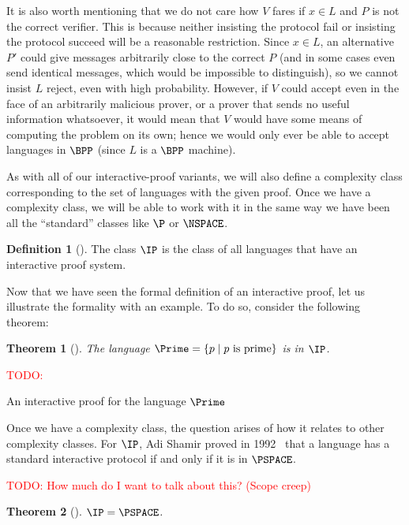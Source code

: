 \documentclass[english,12pt]{reedthesis}
\theoremstyle{plain}
\newtheorem{thm}{Theorem}[section]
\theoremstyle{definition}
\newtheorem{defn}[defn]{Definition}
\theoremstyle{remark}
\newcommand{\TODO}[1]{\textcolor{red}{TODO: #1}}
\begin{document}
It is also worth mentioning that we do not care how $V$ fares if $x \in L$ and $P$
is not the correct verifier. This is because neither insisting the protocol fail
or insisting the protocol succeed will be a reasonable restriction. Since
$x \in L$, an alternative $P'$ could give messages arbitrarily close to the
correct $P$ (and in some cases even send identical messages, which would be
impossible to distinguish), so we cannot insist $L$ reject, even with high
probability. However, if $V$ could accept even in the face of an arbitrarily
malicious prover, or a prover that sends no useful information whatsoever, it
would mean that $V$ would have some means of computing the problem on its own;
hence we would only ever be able to accept languages in $\BPP$ (since $L$ is a
$\BPP$ machine).

As with all of our interactive-proof variants, we will also define a complexity
class corresponding to the set of languages with the given proof. Once we have a
complexity class, we will be able to work with it in the same way we have been
all the ``standard'' classes like $\P$ or $\NSPACE$.

\begin{defn}[{\cite[Def.\ 4.2.5]{Go01}}]\label{def:ip}
  The class $\IP$ is the class of all languages that have an interactive proof
  system.
\end{defn}

Now that we have seen the formal definition of an interactive proof, let us
illustrate the formality with an example. To do so, consider the following
theorem:

\begin{thm}[{\cite{Pra75}}]\label{thm:primes-in-ip}
  The language $\Prime = \{p \mid p \text{ is prime}\}$ is in $\IP$.
\end{thm}

\begin{algorithm}[htbp]
  \TODO{}
  \caption{An interactive proof for the language $\Prime$}\label{alg:prime-ip}
\end{algorithm}

Once we have a complexity class, the question arises of how it relates to other
complexity classes. For $\IP$, Adi Shamir proved in 1992~\cite{Sha92} that a
language has a standard interactive protocol if and only if it is in $\PSPACE$.

\TODO{How much do I want to talk about this? (Scope creep)}
\begin{thm}[{\cite{Sha92}}]\label{thm:ip-is-pspace}
  $\IP = \PSPACE$.
\end{thm}
\end{document}
